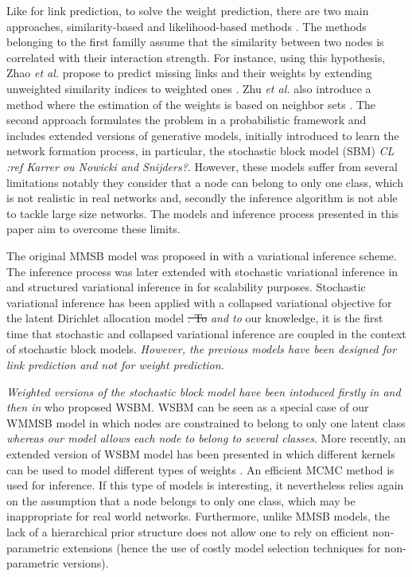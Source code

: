 Like for link prediction, to solve the weight prediction, there are two main approaches, similarity-based and likelihood-based methods \cite{Lu2011}. The methods belonging to the first familly assume that the similarity between two nodes is correlated with their interaction strength. For instance, using this hypothesis, Zhao \textit{et al.} propose to predict missing links and their weights by extending unweighted similarity indices to weighted ones \cite{Zhao2015}. Zhu \textit{et al.} also introduce a method where the estimation of the weights is based on neighbor sets \cite{Zhu2016}.
The second approach formulates the problem in a probabilistic framework and includes extended versions of generative models, initially introduced to learn the network formation process, in particular, the stochastic block model (SBM) \cite{Karrer2011} \textit{CL :ref  Karrer ou Nowicki and Snijders?}.  
However, these models suffer from several limitations notably they consider that a node can  belong to only one class, which is not realistic in real networks and, secondly the inference algorithm is not able to tackle large size networks. The models and inference process presented in this paper aim to overcome these limits. 


The original MMSB model was proposed in \cite{airoldi2009mixed} with a variational inference scheme. The inference process was later extended with stochastic variational inference in \cite{gopalan2013efficient} and structured variational inference in \cite{kim2013efficient} for scalability purposes. Stochastic variational inference has been applied with a collapsed variational objective for the latent Dirichlet allocation model \cite{foulds2013stochastic}\sout{. To} \textit{and to} our knowledge, it is the first time that stochastic and collapsed variational inference are coupled in the context of stochastic block models. \textit{However, the previous models have been designed for link prediction and not for weight prediction.  }

\textit{Weighted versions of the stochastic block model have been intoduced firstly in \cite{mariadassou2010} and then in} \cite{aicher2014learning} who proposed WSBM. WSBM can be seen as a special case of our WMMSB model  in which nodes are constrained to belong to only one latent class \textit{whereas our model allows each node to belong to several classes}. More recently, an extended version of WSBM  model has been presented  in which different kernels can be used to model different types of weights \cite{peixoto2018nonparametric}. An efficient MCMC method is used for inference. If this type of models is interesting, it nevertheless relies again on the assumption that a node belongs to only one class, which may be inappropriate for real world networks. Furthermore, unlike MMSB models, the lack of a hierarchical prior structure does not allow one to rely on efficient non-parametric extensions (hence the use of costly model selection techniques for non-parametric versions). 

